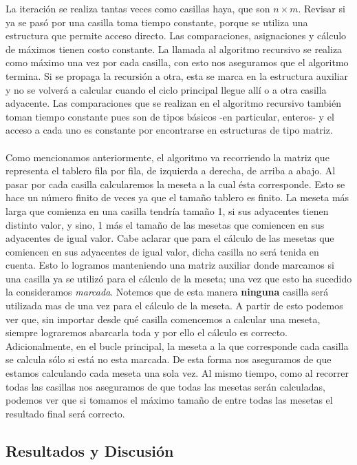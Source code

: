 \documentclass[10pt, a4paper,english,spanish]{article}
\begin{document}
La iteración se realiza tantas veces como casillas haya, que son $n\times m$. Revisar si ya se pasó por una casilla
toma tiempo constante, porque se utiliza una estructura que permite acceso directo.
Las comparaciones, asignaciones y cálculo de máximos tienen costo constante. 
La llamada al algoritmo recursivo se realiza como máximo una vez por cada casilla, con esto nos aseguramos que el algoritmo termina. 
Si se propaga la recursión a
otra, esta se marca en la estructura auxiliar y no se volverá a calcular cuando el ciclo principal llegue allí
o a otra casilla adyacente. Las comparaciones que se realizan en el algoritmo
recursivo también toman tiempo constante pues son de tipos básicos -en particular, enteros- y el acceso a cada uno
es constante por encontrarse en estructuras de tipo matriz. 
\\\\
\indent Como mencionamos anteriormente, el algoritmo va recorriendo la matriz que representa el tablero fila por fila, de izquierda 
a derecha, de arriba a abajo. Al pasar por cada casilla calcularemos la meseta a la cual ésta corresponde. Esto se hace un número 
finito de veces ya que el tamaño tablero es finito. 
La meseta más larga que 
comienza en una casilla tendría tamaño 1, si sus adyacentes tienen distinto valor, y 
sino, 1 más el tamaño de las mesetas que comiencen en sus adyacentes de igual valor. 
Cabe aclarar que para el cálculo de las mesetas que comiencen en sus adyacentes de igual valor, dicha casilla 
no será tenida en cuenta. Esto lo logramos manteniendo una matriz auxiliar donde marcamos si una casilla ya se utilizó para el 
cálculo de la meseta; una vez que esto ha sucedido la consideramos \textit{marcada}. Notemos que de esta manera \textbf{ninguna} 
casilla será utilizada mas de una vez para el cálculo de la meseta. 
A partir de esto podemos ver que, sin importar desde qué casilla comencemos a calcular una meseta, siempre lograremos 
abarcarla toda y por ello el cálculo es correcto.
Adicionalmente, en el bucle principal, la meseta a la que 
corresponde cada casilla se calcula sólo si está no esta marcada. De esta forma nos aseguramos de que estamos calculando 
cada meseta una sola vez. Al mismo tiempo, como al recorrer todas las casillas nos aseguramos de que todas las mesetas serán 
calculadas, podemos ver que si tomamos el máximo tamaño de entre todas las mesetas el resultado final será correcto.

	  


\subsection{Resultados y Discusión}
	
\end{document}
